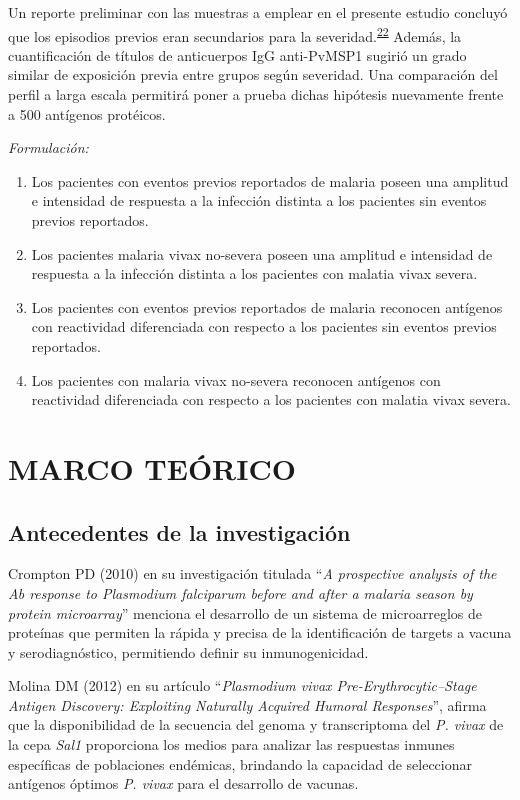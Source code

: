 \documentclass[]{article}
\begin{document}
Un reporte preliminar con las muestras a emplear en el presente estudio
concluyó que los episodios previos eran secundarios para la
severidad.\textsuperscript{\protect\hyperlink{ref-baldevi2013}{22}}
Además, la cuantificación de títulos de anticuerpos IgG anti-PvMSP1
sugirió un grado similar de exposición previa entre grupos según
severidad. Una comparación del perfil a larga escala permitirá poner a
prueba dichas hipótesis nuevamente frente a 500 antígenos protéicos.

\emph{Formulación:}

\begin{enumerate}
\def\labelenumi{\arabic{enumi}.}
\item
  Los pacientes con eventos previos reportados de malaria poseen una
  amplitud e intensidad de respuesta a la infección distinta a los
  pacientes sin eventos previos reportados.
\item
  Los pacientes malaria vivax no-severa poseen una amplitud e intensidad
  de respuesta a la infección distinta a los pacientes con malatia vivax
  severa.
\item
  Los pacientes con eventos previos reportados de malaria reconocen
  antígenos con reactividad diferenciada con respecto a los pacientes
  sin eventos previos reportados.
\item
  Los pacientes con malaria vivax no-severa reconocen antígenos con
  reactividad diferenciada con respecto a los pacientes con malatia
  vivax severa.
\end{enumerate}

\section{MARCO TEÓRICO}\label{marco-teorico}

\subsection{Antecedentes de la
investigación}\label{antecedentes-de-la-investigacion}

Crompton PD (2010) en su investigación titulada ``\emph{A prospective
analysis of the Ab response to Plasmodium falciparum before and after a
malaria season by protein microarray}'' menciona el desarrollo de un
sistema de microarreglos de proteínas que permiten la rápida y precisa
de la identificación de targets a vacuna y serodiagnóstico, permitiendo
definir su inmunogenicidad.

Molina DM (2012) en su artículo ``\emph{Plasmodium vivax
Pre-Erythrocytic--Stage Antigen Discovery: Exploiting Naturally Acquired
Humoral Responses}'', afirma que la disponibilidad de la secuencia del
genoma y transcriptoma del \emph{P. vivax} de la cepa \emph{Sal1}
proporciona los medios para analizar las respuestas inmunes específicas
de poblaciones endémicas, brindando la capacidad de seleccionar
antígenos óptimos \emph{P. vivax} para el desarrollo de vacunas.
\end{document}
